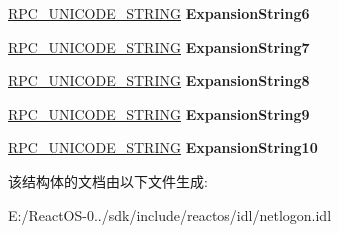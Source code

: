 \begin{DoxyCompactItemize}
\hyperlink{struct___r_p_c___u_n_i_c_o_d_e___s_t_r_i_n_g}{R\+P\+C\+\_\+\+U\+N\+I\+C\+O\+D\+E\+\_\+\+S\+T\+R\+I\+NG} {\bfseries Expansion\+String6}
\item 
\mbox{\label{struct___n_e_t_l_o_g_o_n___v_a_l_i_d_a_t_i_o_n___s_a_m___i_n_f_o4_a6e98d4b5bd18aa2ba8eb6c9a3d4fa9c8}} 
\hyperlink{struct___r_p_c___u_n_i_c_o_d_e___s_t_r_i_n_g}{R\+P\+C\+\_\+\+U\+N\+I\+C\+O\+D\+E\+\_\+\+S\+T\+R\+I\+NG} {\bfseries Expansion\+String7}
\item 
\mbox{\label{struct___n_e_t_l_o_g_o_n___v_a_l_i_d_a_t_i_o_n___s_a_m___i_n_f_o4_a09dd041a6a4fcb37a5e70681491ea000}} 
\hyperlink{struct___r_p_c___u_n_i_c_o_d_e___s_t_r_i_n_g}{R\+P\+C\+\_\+\+U\+N\+I\+C\+O\+D\+E\+\_\+\+S\+T\+R\+I\+NG} {\bfseries Expansion\+String8}
\item 
\mbox{\label{struct___n_e_t_l_o_g_o_n___v_a_l_i_d_a_t_i_o_n___s_a_m___i_n_f_o4_af067805e438b36a6f28bbb78d192f184}} 
\hyperlink{struct___r_p_c___u_n_i_c_o_d_e___s_t_r_i_n_g}{R\+P\+C\+\_\+\+U\+N\+I\+C\+O\+D\+E\+\_\+\+S\+T\+R\+I\+NG} {\bfseries Expansion\+String9}
\item 
\mbox{\label{struct___n_e_t_l_o_g_o_n___v_a_l_i_d_a_t_i_o_n___s_a_m___i_n_f_o4_ac6a5856ac570b75f9268ccb59dca9725}} 
\hyperlink{struct___r_p_c___u_n_i_c_o_d_e___s_t_r_i_n_g}{R\+P\+C\+\_\+\+U\+N\+I\+C\+O\+D\+E\+\_\+\+S\+T\+R\+I\+NG} {\bfseries Expansion\+String10}
\end{DoxyCompactItemize}


该结构体的文档由以下文件生成\+:\begin{DoxyCompactItemize}
\item 
E\+:/\+React\+O\+S-\/0../sdk/include/reactos/idl/netlogon.\+idl\end{DoxyCompactItemize}
